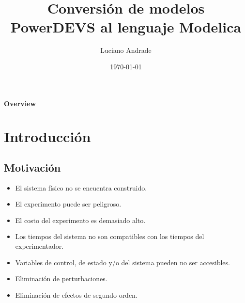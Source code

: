 \documentclass{beamer}
\title{Conversión de modelos PowerDEVS al lenguaje Modelica} %
\author{Luciano Andrade} %
\institute[UNR] %
{
Universidad Nacional de Rosario\\ %
\medskip
\textit{andrade.luciano@gmail.com} %
}
\date{\today} %
\begin{document}
\newcommand{\quotes}[1]{``#1''}

\begin{frame}
\titlepage %
\end{frame}

\begin{frame}
\frametitle{Overview} %
\tableofcontents %
\end{frame}

\chapter{Introducción}
\section{Motivación}

\begin{frame}
\begin{itemize}
	\item El sistema físico no se encuentra construido.
	
	\item El experimento puede ser peligroso.

	\item El costo del experimento es demasiado alto.

	\item Los tiempos del sistema no son compatibles con los tiempos del experimentador.
\end{itemize}
\end{frame}

\begin{frame}
\begin{itemize}
	\item Variables de control, de estado y/o del sistema pueden no ser accesibles. 

	\item Eliminación de perturbaciones.

	\item Eliminación de efectos de segundo orden. 
\end{itemize}
\end{frame}
\end{document}
